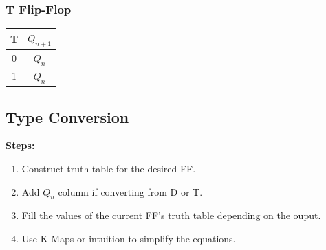 \documentclass[11pt]{article}
\begin{document}
\begin{multicols}{2}
\subsubsection*{T Flip-Flop}
    \begin{minipage}{\linewidth}
        \begin{center}
            \begin{tabular}{ |c|c| } 
                \hline
                T & $Q_{n+1}$ \\
                \hline
                0 & $Q_n$ \\
                \hline
                1 & $\overline{Q_n}$ \\
                \hline
            \end{tabular}
        \end{center}
    \end{minipage}
\end{multicols}

\subsection*{Type Conversion}
\textbf{Steps:}
\begin {enumerate}
    \item Construct truth table for the desired FF.
    \item Add $Q_n$ column if converting from D or T.
    \item Fill the values of the current FF's truth table depending on the ouput.
    \item Use K-Maps or intuition to simplify the equations.
\end {enumerate}
\end{document}
